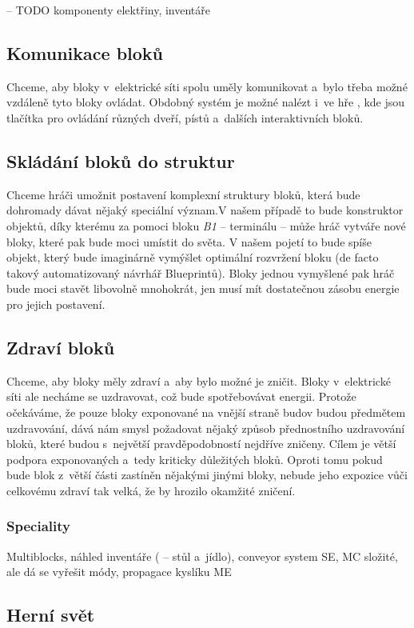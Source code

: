 -- TODO komponenty elektřiny, inventáře

\subsection{Komunikace bloků}

Chceme, aby bloky v~elektrické síti spolu uměly komunikovat a~bylo třeba možné vzdáleně tyto bloky ovládat. Obdobný systém je možné nalézt i~ve hře \SE{}, kde jsou tlačítka pro ovládání různých dveří, pístů a~dalších interaktivních bloků.

\subsection{Skládání bloků do struktur}
Chceme hráči umožnit postavení komplexní struktury bloků, která bude dohromady dávat nějaký speciální význam.V našem případě to bude konstruktor objektů, díky kterému za pomoci bloku \textit{B1} -- terminálu -- může hráč vytváře nové bloky, které pak bude moci umístit do světa. V našem pojetí to bude spíše objekt, který bude imaginárně vymýšlet optimální rozvržení bloku (de facto takový automatizovaný návrhář Blueprintů). Bloky jednou vymyšlené pak hráč bude moci stavět libovolně mnohokrát, jen musí mít dostatečnou zásobu energie pro jejich postavení.

\subsection{Zdraví bloků}
Chceme, aby bloky měly zdraví a~aby bylo možné je zničit. Bloky v~elektrické síti ale necháme se uzdravovat, což bude spotřebovávat energii. Protože očekáváme, že pouze bloky exponované na vnější straně budov budou předmětem uzdravování, dává nám smysl požadovat nějaký způsob přednostního uzdravování bloků, které budou s~největší pravděpodobností nejdříve zničeny. Cílem je větší podpora exponovaných a~tedy kriticky důležitých bloků. Oproti tomu pokud bude blok z~větší části zastíněn nějakými jinými bloky, nebude jeho expozice vůči celkovému zdraví tak velká, že by hrozilo okamžité zničení.

\subsubsection{Speciality}
Multiblocks, náhled inventáře (\ME{} -- stůl a~jídlo), conveyor system SE, MC složité, ale dá se vyřešit módy, propagace kyslíku ME

\subsection{Herní svět}

